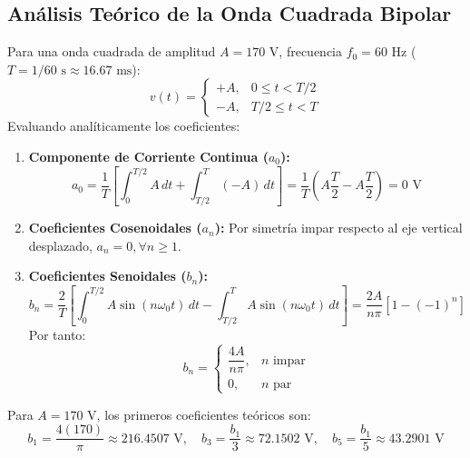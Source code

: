 \documentclass[11pt,a4paper]{article}
\begin{document}
\subsection{Análisis Teórico de la Onda Cuadrada Bipolar}
Para una onda cuadrada de amplitud $A = 170\text{ V}$, frecuencia $f_0 = 60\text{ Hz}$ ($T = 1/60\text{ s} \approx 16.67\text{ ms}$):
\begin{equation}
    v(t) = \begin{cases}
        +A, & 0 \le t < T/2 \\
        -A, & T/2 \le t < T
    \end{cases}
\end{equation}
Evaluando analíticamente los coeficientes:
\begin{enumerate}[leftmargin=*]
    \item \textbf{Componente de Corriente Continua ($a_0$):}
    \begin{equation}
        a_0 = \frac{1}{T}\left[ \int_0^{T/2} A\, dt + \int_{T/2}^T (-A)\, dt \right] = \frac{1}{T}\left( A\frac{T}{2} - A\frac{T}{2} \right) = 0\text{ V}
    \end{equation}
    \item \textbf{Coeficientes Cosenoidales ($a_n$):} Por simetría impar respecto al eje vertical desplazado, $a_n = 0, \forall n \ge 1$.
    \item \textbf{Coeficientes Senoidales ($b_n$):}
    \begin{equation}
        b_n = \frac{2}{T}\left[ \int_0^{T/2} A \sin(n\omega_0 t)\, dt - \int_{T/2}^T A \sin(n\omega_0 t)\, dt \right] = \frac{2A}{n\pi}\left[ 1 - (-1)^n \right]
    \end{equation}
    Por tanto:
    \begin{equation}
        b_n = \begin{cases}
            \dfrac{4A}{n\pi}, & n \text{ impar} \\[0.3cm]
            0, & n \text{ par}
        \end{cases}
        \label{eq:bn_cuadrada}
    \end{equation}
\end{enumerate}

Para $A = 170\text{ V}$, los primeros coeficientes teóricos son:
\begin{equation}
    b_1 = \frac{4(170)}{\pi} \approx 216.4507\text{ V}, \quad b_3 = \frac{b_1}{3} \approx 72.1502\text{ V}, \quad b_5 = \frac{b_1}{5} \approx 43.2901\text{ V}
\end{equation}
\end{document}
